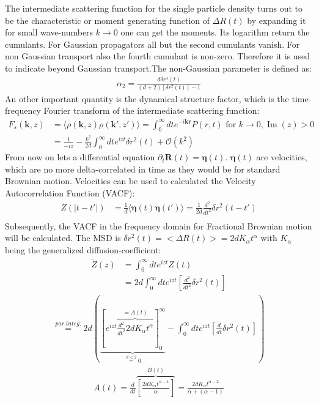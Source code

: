 \documentclass[
  a4paper,BCOR10mm,oneside,
  bibtotoc,idxtotoc,
  headsepline,footsepline,%
  fleqn,openbib
]{scrbook}
\begin{document}
The intermediate scattering function for the single particle density turns out to be the characteristic or moment generating function of $\Delta R(t)$ by expanding it for small wave-numbers $k \rightarrow 0$ one can get the moments. Its logarithm return the cumulants. For Gaussian propagators all but the second cumulants vanish. For non Gaussian transport also the fourth cumulant is non-zero. Therefore it is used to indicate beyond Gaussian transport.The non-Gaussian parameter is defined as:
\begin{align}
 \alpha_2=\frac{d \delta r^{4}(t)}{(d+2) [\delta r^{2}(t)]-1}
\end{align}
An other important quantity is the dynamical structure factor, which is the time-frequency Fourier transform of the intermediate scattering function:
\begin{align}
 F_{s}(\bm{k},z)&=\langle\rho(\bm{k},z) \rho(\bm{k}',z')\rangle=\int_{0}^{\infty} d t e^{-i \bm{k} \bm{r}} P(r,t) \text{ for } k \rightarrow 0 , \operatorname{Im}(z) > 0 \\
 &= \frac{1}{-iz}-\frac{k^2}{2d}\int_{0}^{\infty} d t e^{izt} \delta r^2 (t) + \mathcal{O}(k^2)
\end{align}
From now on lets a differential equation $\partial_t \bm{R}(t)=\bm{\eta}(t)$. $\bm{\eta}(t)$ are velocities, which are no more delta-correlated in time as they would be for standard Brownian motion. Velocities can be used to calculated the Velocity Autocorrelation Function (VACF):
\begin{align}
Z(|t-t'|)&= \frac{1}{d}\langle \bm{\eta}(t) \bm{\eta}(t') \rangle = \frac{1}{2d} \frac{d^2}{dt^2} \delta r^2 (t-t')  \\
\end{align}
Subsequently, the VACF in the frequency domain for Fractional Brownian motion will be calculated. The MSD is $\delta r^{2}(t)= < \Delta R(t)>=2dK_{\alpha}t^{\alpha}$ with $K_{\alpha}$ being the generalized diffusion-coefficient:
\begin{align*}
 \tilde{Z}(z)&=\int_{0}^{\infty} d t e^{izt} Z(t) \\
 &=2 d \int_{0}^{\infty} d t e^{izt} \left[\frac{d^2}{dt^2}\delta r^2 (t) \right]
\end{align*}
\begin{align*}
  \stackrel{par. integ.}{=} 2d \left( \underbrace{\left [ e^{izt}\overbrace{ \frac{d^2}{dt^2} 2dK_{\alpha}t^{\alpha}}^{=A(t)} \right]_{0}^{\infty}}_{\stackrel{\alpha < 2} {=} 0}-\int_{0}^{\infty} d t e^{izt} \left[\frac{d}{dt}\delta r^2 (t)\right] \right) 
 \end{align*}
 \begin{align*}
 A(t)=\frac{d}{dt}\overbrace{ \left [\frac{2d K_{\alpha}t^{\alpha-1}}{\alpha} \right ]}^{B(t)}=\frac{2d K_{\alpha}t^{\alpha-2}}{\alpha+(\alpha-1)}
\end{align*}
\end{document}
